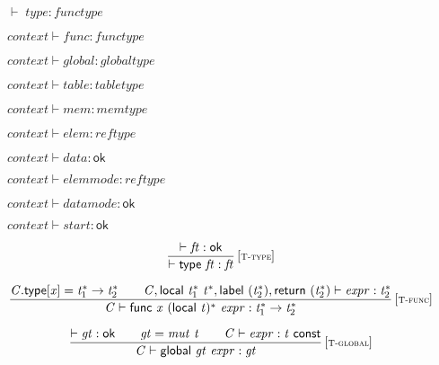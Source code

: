 \vspace{1ex}

$\boxed{{ \vdash }\;{\mathit{type}} : {\mathit{functype}}}$

$\boxed{{\mathit{context}} \vdash {\mathit{func}} : {\mathit{functype}}}$

$\boxed{{\mathit{context}} \vdash {\mathit{global}} : {\mathit{globaltype}}}$

$\boxed{{\mathit{context}} \vdash {\mathit{table}} : {\mathit{tabletype}}}$

$\boxed{{\mathit{context}} \vdash {\mathit{mem}} : {\mathit{memtype}}}$

$\boxed{{\mathit{context}} \vdash {\mathit{elem}} : {\mathit{reftype}}}$

$\boxed{{\mathit{context}} \vdash {\mathit{data}} : \mathsf{ok}}$

$\boxed{{\mathit{context}} \vdash {\mathit{elemmode}} : {\mathit{reftype}}}$

$\boxed{{\mathit{context}} \vdash {\mathit{datamode}} : \mathsf{ok}}$

$\boxed{{\mathit{context}} \vdash {\mathit{start}} : \mathsf{ok}}$

\vspace{1ex}

$$
\begin{array}{@{}c@{}}\displaystyle
\frac{
{ \vdash }\;{\mathit{ft}} : \mathsf{ok}
}{
{ \vdash }\;\mathsf{type}~{\mathit{ft}} : {\mathit{ft}}
} \, {[\textsc{\scriptsize T{-}type}]}
\qquad
\end{array}
$$

$$
\begin{array}{@{}c@{}}\displaystyle
\frac{
{\mathit{C}}.\mathsf{type}{}[{\mathit{x}}] = {{\mathit{t}}_{{1}}^\ast} \rightarrow {{\mathit{t}}_{{2}}^\ast}
 \qquad
{\mathit{C}}, \mathsf{local}~{{\mathit{t}}_{{1}}^\ast}~{{\mathit{t}}^\ast}, \mathsf{label}~({{\mathit{t}}_{{2}}^\ast}), \mathsf{return}~({{\mathit{t}}_{{2}}^\ast}) \vdash {\mathit{expr}} : {{\mathit{t}}_{{2}}^\ast}
}{
{\mathit{C}} \vdash \mathsf{func}~{\mathit{x}}~{(\mathsf{local}~{\mathit{t}})^\ast}~{\mathit{expr}} : {{\mathit{t}}_{{1}}^\ast} \rightarrow {{\mathit{t}}_{{2}}^\ast}
} \, {[\textsc{\scriptsize T{-}func}]}
\qquad
\end{array}
$$

$$
\begin{array}{@{}c@{}}\displaystyle
\frac{
{ \vdash }\;{\mathit{gt}} : \mathsf{ok}
 \qquad
{\mathit{gt}} = {\mathit{mut}}~{\mathit{t}}
 \qquad
{\mathit{C}} \vdash {\mathit{expr}} : {\mathit{t}}~\mathsf{const}
}{
{\mathit{C}} \vdash \mathsf{global}~{\mathit{gt}}~{\mathit{expr}} : {\mathit{gt}}
} \, {[\textsc{\scriptsize T{-}global}]}
\qquad
\end{array}
$$

